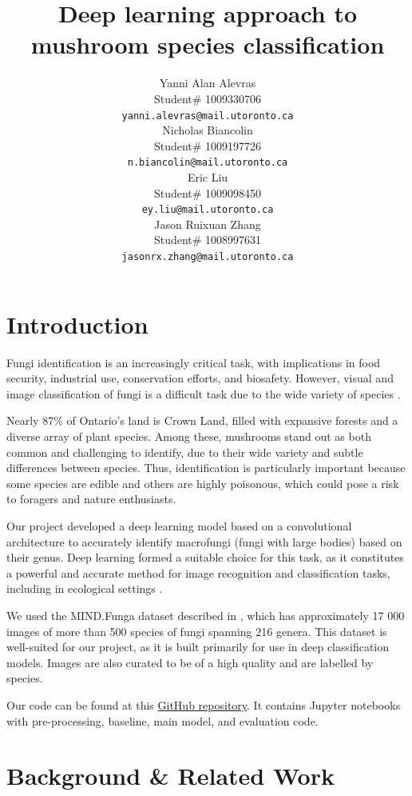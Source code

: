\documentclass{article} %
\title{Deep learning approach to  \\ 
mushroom species classification}
\author{Yanni Alan Alevras  \\
Student\# 1009330706 \\
\texttt{yanni.alevras@mail.utoronto.ca} \\
\And
Nicholas Biancolin  \\
Student\# 1009197726 \\
\texttt{n.biancolin@mail.utoronto.ca} \\
\AND
Eric Liu  \\
Student\# 1009098450 \\
\texttt{ey.liu@mail.utoronto.ca} \\
\And
Jason Ruixuan Zhang \\
Student\# 1008997631 \\
\texttt{jasonrx.zhang@mail.utoronto.ca} \\
\AND
}
\begin{document}
\maketitle

\section{Introduction}
\label{sec:introduction}

Fungi identification is an increasingly critical task, with implications in food security, industrial use, conservation efforts, and biosafety. However, visual and image classification of fungi is a difficult task due to the wide variety of species \citep{LuckingAimeEtAl.UnambiguousIdentificationFungi.2020}.

Nearly 87\% of Ontario's land is Crown Land, filled with expansive forests and a diverse array of plant species. Among these, mushrooms stand out as both common and challenging to identify, due to their wide variety and subtle differences between species. Thus, identification is particularly important because some species are edible and others are highly poisonous, which could pose a risk to foragers and nature enthusiasts.

Our project developed a deep learning model based on a convolutional architecture to accurately identify macrofungi (fungi with large bodies) based on their genus. Deep learning formed a suitable choice for this task, as it constitutes a powerful and accurate method for image recognition and classification tasks, including in ecological settings \citep{SchneiderTaylorEtAl.PresentFutureApproaches.2019}.

We used the MIND.Funga dataset described in \cite{Drechsler-SantosKarstedtEtAl.MINDFunga.2023}, which has approximately 17 000 images of more than 500 species of fungi spanning 216 genera. This dataset is well-suited for our project, as it is built primarily for use in deep classification models. Images are also curated to be of a high quality and are labelled by species.

Our code can be found at this \href{https://github.com/nbiancolin/convolutional-neural-nuts}{GitHub repository}. It contains Jupyter notebooks with pre-processing, baseline, main model, and evaluation code.

\section{Background \& Related Work}
\label{sec:background}
\end{document}
